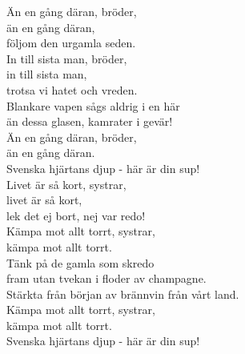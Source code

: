 \documentclass[a6paper, 10pt, twoside]{article}
\begin{document}
\noindent
\begin{center}
\end{center}
\begin{lyrics}
Än en gång däran, bröder,\\
än en gång däran,\\
följom den urgamla seden.\\
In till sista man, bröder,\\
in till sista man,\\
trotsa vi hatet och vreden. \\\digitalonly{\\}
Blankare vapen sågs aldrig i en här\\
än dessa glasen, kamrater i gevär!\\
Än en gång däran, bröder,\\
än en gång däran.\\
Svenska hjärtans djup - här är din sup!
\vspace{5pt}\\
Livet är så kort, systrar,\\
livet är så kort,\\
lek det ej bort, nej var redo!\\
Kämpa mot allt torrt, systrar,\\
kämpa mot allt torrt.\\
Tänk på de gamla som skredo\\\digitalonly{\\}
fram utan tvekan i floder av champagne.\\
Stärkta från början av brännvin från vårt land.\\
Kämpa mot allt torrt, systrar,\\
kämpa mot allt torrt.\\
Svenska hjärtans djup - här är din sup! 
\end{lyrics}
\end{document}
